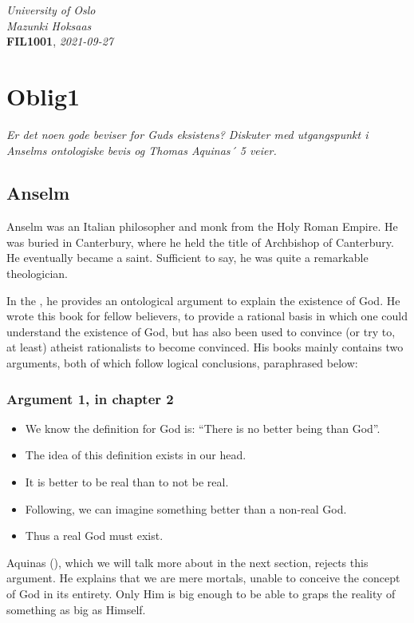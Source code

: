\documentclass{article}
\begin{document}
	\begin{flushright}
		\textit{University of Oslo}
		\\\textit{Mazunki Hoksaas}
		\\\textbf{FIL1001}, \textit{2021-09-27}
	\end{flushright}

	\section*{Oblig1}
	
	\textit{Er det noen gode beviser for Guds eksistens? Diskuter med utgangspunkt i Anselms ontologiske bevis og Thomas Aquinas´ 5 veier.}

	\subsection*{Anselm}
	Anselm was an Italian philosopher and monk from the Holy Roman Empire. He was buried in Canterbury, where he held the title of Archbishop of Canterbury. He eventually became a saint. Sufficient to say, he was quite a remarkable theologician.

	In the , he provides an ontological argument to explain the existence of God. He wrote this book for fellow believers, to provide a rational basis in which one could understand the existence of God, but has also been used to convince (or try to, at least) atheist rationalists to become convinced. His books mainly contains two arguments, both of which follow logical conclusions, paraphrased below:
	
	\subsubsection*{Argument 1, in chapter 2}
	\begin{itemize}
		\item We know the definition for God is: ``There is no better being than God''.
		\item The idea of this definition exists in our head.
		\item It is better to be real than to not be real.
		\item Following, we can imagine something better than a non-real God.
		\item Thus a real God must exist.
	\end{itemize}

	Aquinas (\citeyear{aquinas1485}), which we will talk more about in the next section, rejects this argument. He explains that we are mere mortals, unable to conceive the concept of God in its entirety. Only Him is big enough to be able to graps the reality of something as big as Himself.
\end{document}

